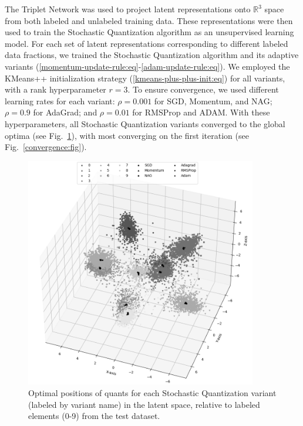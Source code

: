 The Triplet Network was used to project latent representations onto $\mathbb{R}^3$ space from both labeled and unlabeled training data. These representations were then used to train the Stochastic Quantization algorithm as an unsupervised learning model. For each set of latent representations corresponding to different labeled data fractions, we trained the Stochastic Quantization algorithm and its adaptive variants (\ref{momentum-update-rule:eq}-\ref{adam-update-rule:eq}). We employed the KMeans++ initialization strategy (\ref{kmeans-plus-plus-init:eq}) for all variants, with a rank hyperparameter $r = 3$. To ensure convergence, we used different learning rates for each variant: $\rho = 0.001$ for SGD, Momentum, and NAG; $\rho = 0.9$ for AdaGrad; and $\rho = 0.01$ for RMSProp and ADAM. With these hyperparameters, all Stochastic Quantization variants converged to the global optima (see Fig.~\ref{quants:fig}), with most converging on the first iteration (see Fig.~\ref{convergence:fig}).

\begin{figure}
    \centering
    \includegraphics[width=0.9\textwidth]{figures/sq_quants.png}
    \caption{Optimal positions of quants for each Stochastic Quantization variant (labeled by variant name) in the latent space, relative to labeled elements (0-9) from the test dataset.}
    \label{quants:fig}
\end{figure}

